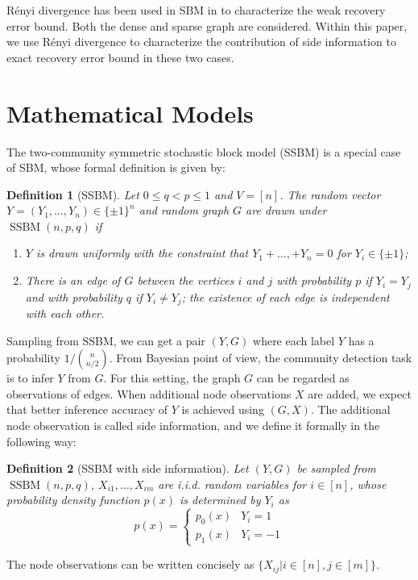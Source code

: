 \documentclass[conference]{IEEEtran}
\newtheorem{definition}{Definition}
\DeclareMathOperator{\SSBM}{SSBM}
\begin{document}
Rényi divergence has been used in SBM in \cite{zhang2016} to characterize the weak recovery error bound. Both the dense and sparse graph are considered.
Within this paper, we use Rényi divergence to characterize
the contribution of side information to exact recovery error bound in these two cases.
\section{Mathematical Models}\label{s:model}
The two-community symmetric stochastic block model (SSBM) is a special case of SBM, whose formal definition is given by:
\begin{definition}[SSBM]
	Let $0\leq q<p\leq 1$ and $V=[n]$. The random vector $Y=(Y_1,\dots,Y_n)\in \{\pm 1\}^n$ and random graph $G$ are drawn under $\SSBM(n,p,q)$ if
	\begin{enumerate}
		\item $Y$ is drawn uniformly with the constraint that $Y_1 + \dots, + Y_n = 0$ for $Y_i \in \{\pm 1 \}$;
		
		\item There is an edge of $G$ between the vertices $i$ and $j$ with probability $p$ if $Y_i=Y_j$ and with probability $q$ if $Y_i \neq Y_j$; the existence of each edge is independent with each other.
	\end{enumerate}
\end{definition}
Sampling from SSBM, we can get a pair $(Y,G)$ where each label $Y$ has a probability $ 1/ \binom{n}{n/2}$.
From Bayesian point of view, the community detection task is to infer $Y$ from $G$.
For this setting, the graph $G$ can be regarded as observations of edges. When
additional node observations $X$ are added, we expect that better inference accuracy of $Y$ is achieved using $(G,X)$.
The additional node observation is called side information, and we define it formally in the following way:
\begin{definition}[SSBM with side information]
	Let $(Y,G)$ be sampled from $\SSBM(n,p,q)$, $X_{i1}, \dots, X_{im}$ are i.i.d. random variables for $i \in [n]$,
	whose probability density function $p(x)$ is determined by $Y_i$ as
	\begin{equation}
	p(x) = \begin{cases}
	p_0(x) & Y_i = 1 \\
	p_1(x) & Y_i = -1
	\end{cases}
	\end{equation}
\end{definition}
The node observations can be written concisely as $\{X_{ij} | i \in [n], j \in [m]\}$.
\end{document}
